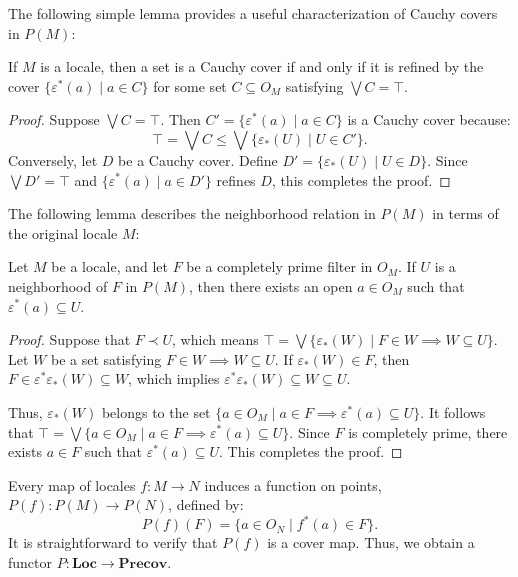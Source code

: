 \documentclass[reqno]{amsart}
\theoremstyle{definition}
\theoremstyle{remark}
\numberwithin{figure}{section}
\newcommand{\rb}{\prec}
\newcommand{\cat}[1]{\mathbf{#1}}
\begin{document}
The following simple lemma provides a useful characterization of Cauchy covers in $P(M)$:

\begin{lem}
If $M$ is a locale, then a set is a Cauchy cover if and only if it is refined by the cover $\{ \varepsilon^*(a) \mid a \in C \}$
for some set $C \subseteq O_M$ satisfying $\bigvee C = \top$.
\end{lem}
\begin{proof}
Suppose $\bigvee C = \top$.
Then $C' = \{ \varepsilon^*(a) \mid a \in C \}$ is a Cauchy cover because:
\[ \top = \bigvee C \leq \bigvee \{ \varepsilon_*(U) \mid U \in C' \}. \]
Conversely, let $D$ be a Cauchy cover.
Define $D' = \{ \varepsilon_*(U) \mid U \in D \}$.
Since $\bigvee D' = \top$ and $\{ \varepsilon^*(a) \mid a \in D' \}$ refines $D$, this completes the proof.
\end{proof}

The following lemma describes the neighborhood relation in $P(M)$ in terms of the original locale $M$:

\begin{lem}
Let $M$ be a locale, and let $F$ be a completely prime filter in $O_M$.
If $U$ is a neighborhood of $F$ in $P(M)$, then there exists an open $a \in O_M$ such that $\varepsilon^*(a) \subseteq U$.
\end{lem}
\begin{proof}
Suppose that ${ F } \rb U$, which means $\top = \bigvee \{ \varepsilon_*(W) \mid F \in W \implies W \subseteq U \}$.
Let $W$ be a set satisfying $F \in W \implies W \subseteq U$.
If $\varepsilon_*(W) \in F$, then $F \in \varepsilon^*\varepsilon_*(W) \subseteq W$, which implies $\varepsilon^*\varepsilon_*(W) \subseteq W \subseteq U$.

Thus, $\varepsilon_*(W)$ belongs to the set $\{ a \in O_M \mid a \in F \implies \varepsilon^*(a) \subseteq U \}$.
It follows that $\top = \bigvee \{ a \in O_M \mid a \in F \implies \varepsilon^*(a) \subseteq U \}$.
Since $F$ is completely prime, there exists $a \in F$ such that $\varepsilon^*(a) \subseteq U$.
This completes the proof.
\end{proof}

Every map of locales $f : M \to N$ induces a function on points, $P(f) : P(M) \to P(N)$, defined by:
\[ P(f)(F) = \{ a \in O_N \mid f^*(a) \in F \}. \]
It is straightforward to verify that $P(f)$ is a cover map.
Thus, we obtain a functor $P : \cat{Loc} \to \cat{Precov}$.
\end{document}

